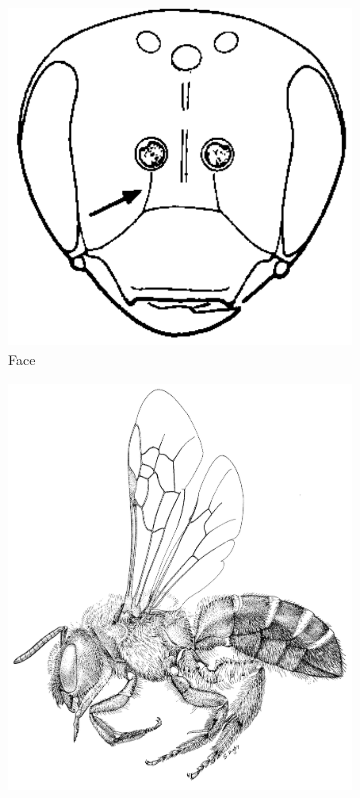\documentclass[letterpaper, 11pt]{article}
\begin{document}
\begin{figure}[ht!]
    \centering
    \begin{subfigure}[ht!]{0.26\textwidth}
        \includegraphics[width=\textwidth]{HalictidFace}
        \caption{Face \citep[][pg. 315]{goulet1993hymenoptera}}
        \label{fig:halict1}
    \end{subfigure}
    \qquad
    \begin{subfigure}[ht!]{0.4\textwidth}
        \includegraphics[width=\textwidth]{HalictidHabitus}

\end{subfigure}
\end{figure}
\end{document}
